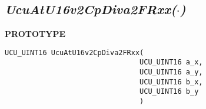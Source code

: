 %
%
%
%
\subsection[\emph{UcuAtU16v2CpDiva2FRxx(\protect\mbox{\protect$\cdot$})}]
           {\emph{UcuAtU16v2CpDiva2FRxx(\protect\mbox{\protect\boldmath $\cdot$})}}
\label{cafn0:svft0:scpt0}

%

\noindent\textbf{PROTOTYPE}
\begin {list}{}{\setlength{\leftmargin}{0.25in}\setlength{\topsep}{0.0in}}
\item
\begin{verbatim}
UCU_UINT16 UcuAtU16v2CpDiva2FRxx(
                                UCU_UINT16 a_x, 
                                UCU_UINT16 a_y, 
                                UCU_UINT16 b_x, 
                                UCU_UINT16 b_y
                                )
\end{verbatim}
\end{list}
\vspace{2.8ex}

